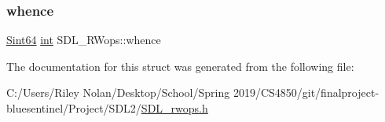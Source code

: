 \subsubsection{\texorpdfstring{whence}{whence}}
{\footnotesize\ttfamily \mbox{\hyperlink{_s_d_l__stdinc_8h_a2c1a61d5c466bb74680be0a8cc1b455d}{Sint64}} \mbox{\hyperlink{struct_s_d_l___r_wops_ab303bcbb0f6742a141ba8b2998923f47}{int}} S\+D\+L\+\_\+\+R\+Wops\+::whence}



The documentation for this struct was generated from the following file\+:\begin{DoxyCompactItemize}
\item 
C\+:/\+Users/\+Riley Nolan/\+Desktop/\+School/\+Spring 2019/\+C\+S4850/git/finalproject-\/bluesentinel/\+Project/\+S\+D\+L2/\mbox{\hyperlink{_s_d_l__rwops_8h}{S\+D\+L\+\_\+rwops.\+h}}\end{DoxyCompactItemize}
